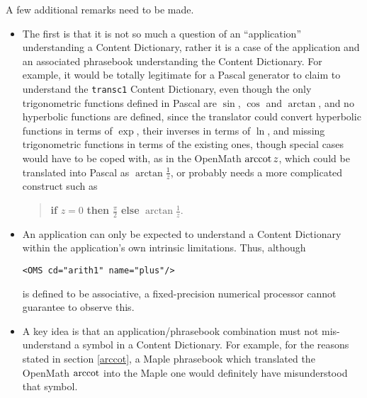 \documentclass[keylogo]{openmath}
\begin{document}
A few additional remarks need to be made.
\begin{itemize}
\item The first is that it is not so much a question of an
  ``application'' understanding a Content Dictionary, rather it is a
  case of the application and an associated phrasebook understanding
  the Content Dictionary. For example, it would be totally legitimate
  for a Pascal generator to claim to understand the {\tt transc1}
  Content Dictionary, even though the only trigonometric functions
  defined in Pascal \cite{IEEEPascal} are $\sin$, $\cos$ and
  $\arctan$, and no hyperbolic functions are defined, since the
  translator could convert hyperbolic functions in terms of $\exp$,
  their inverses in terms of $\ln$, and missing trigonometric
  functions in terms of the existing ones, though special cases would
  have to be coped with, as in the OpenMath $\mathop{\rm arccot} z$, which could
  be translated into Pascal as $\arctan\frac1z$, or probably needs a
  more complicated construct such as
\begin{quote}
  {\bf if} $z=0$ {\bf then} $\frac\pi2$ {\bf else} $\arctan\frac1z$.
\end{quote}
\item An application can only be expected to understand a Content
  Dictionary within the application's own intrinsic limitations. Thus,
  although
\begin{verbatim}
<OMS cd="arith1" name="plus"/>
\end{verbatim}
  is defined to be associative, a fixed-precision numerical processor
  cannot guarantee to observe this.
\item A key idea is that an application/phrasebook combination must
  not mis-understand a symbol in a Content Dictionary. For example,
  for the reasons stated in section \ref{arccot}, a Maple phrasebook
  which translated the OpenMath $\mathop{\rm arccot}$ into the Maple one would
  definitely have misunderstood that symbol.
\end{itemize}
\end{document}
